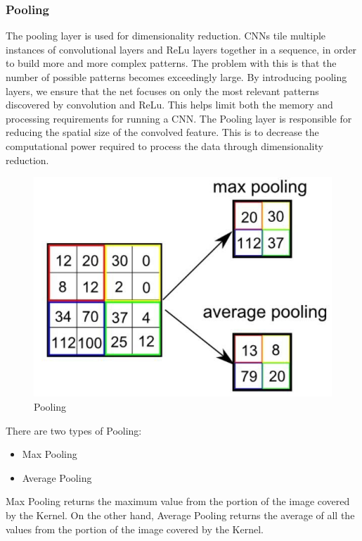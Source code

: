 \subsubsection{Pooling}
The pooling layer is used for dimensionality reduction. CNNs tile multiple instances of
convolutional layers and ReLu layers together in a sequence, in order to build more and
more complex patterns. The problem with this is that the number of possible patterns becomes exceedingly large. By introducing pooling layers, we ensure that the net focuses on only the most relevant patterns discovered by convolution and ReLu. This helps limit
both the memory and processing requirements for running a CNN. The Pooling layer is responsible for reducing the spatial size of the convolved feature. This is to decrease the computational power required to process the data through dimensionality reduction. \\
\begin{figure}[h]
	\label{ss}
	\centering
	\includegraphics[width= 9 cm]{pooling1.jpg}
	\caption{Pooling}
\end{figure}

There are two types of Pooling:
\begin{itemize}
\item{Max Pooling}
\item{Average Pooling}
\end{itemize}


Max Pooling returns the maximum value from the portion of the image covered by the Kernel. On the other hand, Average Pooling returns the average of all the values from the portion of the image covered by the Kernel.


